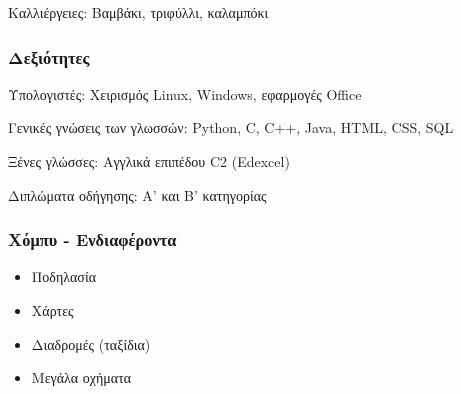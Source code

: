 Καλλιέργειες: Βαμβάκι, τριφύλλι, καλαμπόκι

\subsubsection{Δεξιότητες}\label{ux3b4ux3b5ux3beux3b9ux3ccux3c4ux3b7ux3c4ux3b5ux3c2}

Υπολογιστές: Χειρισμός Linux, Windows, εφαρμογές Office

Γενικές γνώσεις των γλωσσών: Python, C, C++, Java, HTML, CSS, SQL

Ξένες γλώσσες: Αγγλικά επιπέδου C2 (Edexcel)

Διπλώματα οδήγησης: Α' και Β' κατηγορίας

\subsubsection{Χόμπυ -
Ενδιαφέροντα}\label{ux3c7ux3ccux3bcux3c0ux3c5---ux3b5ux3bdux3b4ux3b9ux3b1ux3c6ux3adux3c1ux3bfux3bdux3c4ux3b1}

\begin{itemize}
\tightlist
\item
  Ποδηλασία
\item
  Χάρτες
\item
  Διαδρομές (ταξίδια)
\item
  Μεγάλα οχήματα
\end{itemize}
